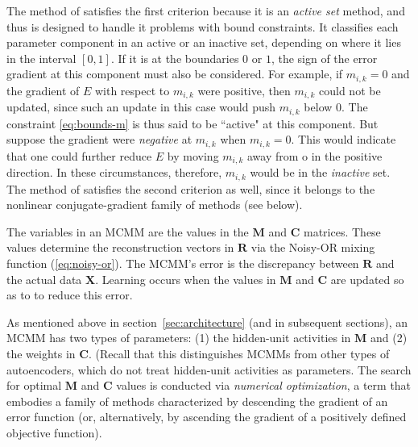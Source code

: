 The method of \citet{cheng-and-li:2012} satisfies the first criterion 
because it is an \emph{active set} method, and thus is designed to handle 
it problems with bound constraints. It classifies each parameter component 
in an active or an inactive set, depending on where it lies in the interval $[0,1]$. 
If it is at the boundaries $0$ or $1$, the sign of the error gradient at this component 
must also be considered. For example, if $m_{i,k} = 0$ and the gradient of $E$ 
with respect to $m_{i,k}$ were positive, then $m_{i,k}$ could not be updated, 
since such an update in this case would push $m_{i,k}$ below $0$.  
The constraint \eqref{eq:bounds-m} is thus said to be ``active" at this component. 
But suppose the gradient were \emph{negative} at $m_{i,k}$ when $m_{i,k} = 0$. 
This would indicate that one could further reduce $E$ by moving $m_{i,k}$ away 
from o in the positive direction. In these circumstances, therefore, $m_{i,k}$ 
would be in the \emph{inactive} set.
The method of \citet{cheng-and-li:2012} satisfies the second criterion as well, 
since it belongs to the nonlinear conjugate-gradient family of methods (see below).

The variables in an MCMM are the values in the $\mathbf{M}$ and 
$\mathbf{C}$ matrices. 
These values determine the 
reconstruction vectors in $\mathbf{R}$ via the Noisy-OR mixing 
function (\eqref{eq:noisy-or}). 
The MCMM's error is the discrepancy between  
$\mathbf{R}$ and the actual data $\mathbf{X}$. Learning occurs 
when the values in $\mathbf{M}$
and $\mathbf{C}$ are updated so as to to reduce this error. 
 
As mentioned above in section~\ref{sec:architecture} (and in subsequent sections), 
an MCMM has two types of parameters:
(1) the hidden-unit activities in $\textbf{M}$ and (2) the weights in $\textbf{C}$. (Recall that this 
distinguishes MCMMs from other types of autoencoders, which do not treat hidden-unit activities as parameters.  
The search for optimal $\textbf{M}$ and $\textbf{C}$ values is conducted
via %
\emph{numerical optimization}, a term that embodies a family of methods characterized by descending the gradient of an error function (or, alternatively, by ascending the gradient of a positively defined objective function). 

